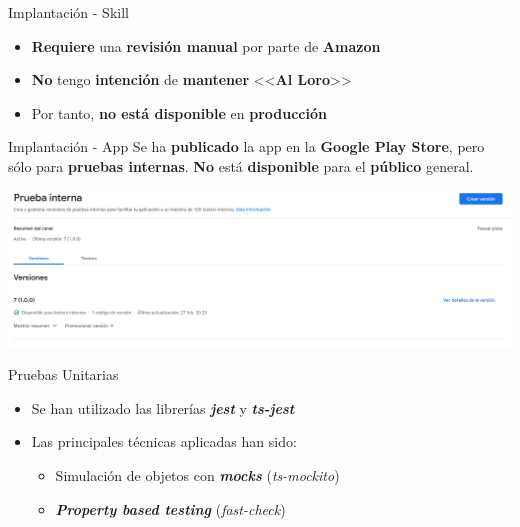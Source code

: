 \documentclass{beamer}
\begin{document}
  \begin{frame}{Implantación - Skill}
    \begin{itemize}
      \setlength\itemsep{1.5em}
      \item \textbf{Requiere} una \textbf{revisión manual} por parte de \textbf{Amazon}
      \item \textbf{No} tengo \textbf{intención} de \textbf{mantener} <<\textbf{Al Loro}>>
      \item Por tanto, \textbf{no está disponible} en \textbf{producción}
    \end{itemize}
  \end{frame}

  \begin{frame}{Implantación - App}
    Se ha \textbf{publicado} la app en la \textbf{Google Play Store}, pero sólo para \textbf{pruebas internas}. \textbf{No} está \textbf{disponible} para el \textbf{público} general.

    \vspace{1.5em}

    \includegraphics[width=\textwidth]{prueba-interna-google-play-console-completa.png}
  \end{frame}

  \begin{frame}{Pruebas Unitarias}
    \begin{itemize}
      \setlength\itemsep{1.5em}
      \item Se han utilizado las librerías \textbf{\emph{jest}} y \textbf{\emph{ts-jest}}
      \item Las principales técnicas aplicadas han sido:
      \vspace{1em}
      \begin{itemize}
        \setlength\itemsep{1em}
        \item Simulación de objetos con \textbf{\emph{mocks}} (\emph{ts-mockito})
        \item \textbf{\emph{Property based testing}} (\emph{fast-check})
      \end{itemize}
    \end{itemize}
  \end{frame}
\end{document}
